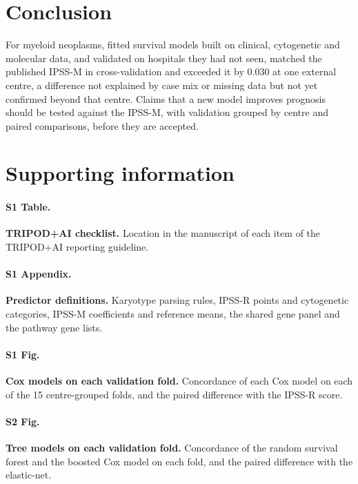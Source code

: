 \documentclass[10pt,letterpaper]{article}
\begin{document}
\section*{Conclusion}
For myeloid neoplasms, fitted survival models built on clinical, cytogenetic and molecular
data, and validated on hospitals they had not seen, matched the published IPSS-M in
cross-validation and exceeded it by 0.030 at one external centre, a difference not explained
by case mix or missing data but not yet confirmed beyond that centre. Claims that a new model improves prognosis should be tested
against the IPSS-M, with validation grouped by centre and paired comparisons, before they
are accepted.

\section*{Supporting information}

\paragraph*{S1 Table.}
\label{S1_Table}
{\bf TRIPOD+AI checklist.} Location in the manuscript of each item of the TRIPOD+AI
reporting guideline.

\paragraph*{S1 Appendix.}
\label{S1_Appendix}
{\bf Predictor definitions.} Karyotype parsing rules, IPSS-R points and cytogenetic
categories, IPSS-M coefficients and reference means, the shared gene panel and the pathway
gene lists.

\paragraph*{S1 Fig.}
\label{S1_Fig}
{\bf Cox models on each validation fold.} Concordance of each Cox model on each of the 15
centre-grouped folds, and the paired difference with the IPSS-R score.

\paragraph*{S2 Fig.}
\label{S2_Fig}
{\bf Tree models on each validation fold.} Concordance of the random survival forest and
the boosted Cox model on each fold, and the paired difference with the elastic-net.
\end{document}

